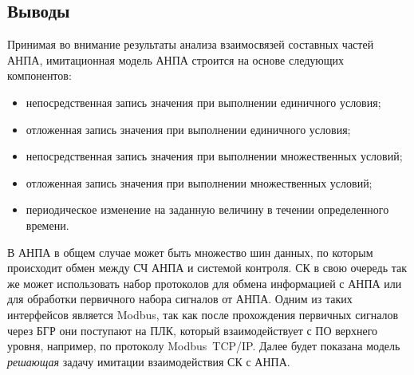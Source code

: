 \subsection*{Выводы}
Принимая во внимание результаты анализа взаимосвязей составных частей АНПА,
имитационная модель АНПА строится на основе следующих компонентов:
\begin{itemize}
    \item непосредственная запись значения при выполнении единичного условия;
    \item отложенная запись значения при выполнении единичного условия;
    \item непосредственная запись значения при выполнении множественных условий;
    \item отложенная запись значения при выполнении множественных условий;
    \item периодическое изменение на заданную величину в течении определенного времени.
\end{itemize}

В АНПА в общем случае может быть множество шин данных, по которым происходит обмен между СЧ АНПА и системой контроля.
СК в свою очередь так же может использовать набор протоколов для обмена информацией с АНПА
или для обработки первичного набора сигналов от АНПА.
Одним из таких интерфейсов является Modbus, так как после прохождения первичных сигналов через БГР
они поступают на ПЛК, который взаимодействует с ПО верхнего уровня, например, по протоколу Modbus~TCP/IP.
Далее будет показана модель \textit{решающая} задачу имитации взаимодействия СК с АНПА.
